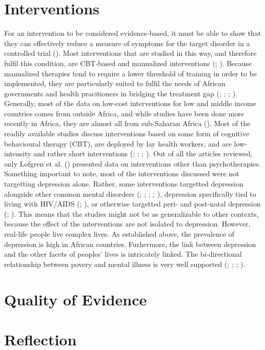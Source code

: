 \documentclass[stu,a4paper,12pt,donotrepeattitle]{apa7}
\begin{document}
\section{Interventions}
For an intervention to be considered evidence-based, it must be able to show
that they can effectively reduce a measure of symptoms for the target disorder
in a controlled trial (\cite{cook17}). Most interventions that are studied in
this way, and therefore fulfil this condition, are CBT-based and manualized
interventions (\cite{cook17}; \cite{shed18}). Because manualized therapies
tend to require a lower threshold of training in order to be implemented, they
are particularly suited to fulfil the needs of African governments and health
pracitioners in bridging the treatment gap (\cite{cook17}; \cite{douketal21};
\cite{lunetal14}; \cite{Osetal20}).\\
Generally, most of the data on low-cost interventions for low and middle income
countries comes from outside Africa, and while studies have been done more
recently in Africa, they are almost all from sub-Saharan Africa
(\cite{logetal18}). Most of the readily available studies discuss interventions
based on some form of cognitive behavioural therapy (CBT), are deployed by
lay health workers, and are low-intensity and rather short interventions
(\cite{chibandaetal11}; \cite{fernaetal21}; \cite{logetal18}; \cite{lunetal14}).
Out of all the articles reviewed, only Lofgren et al. (\citeyear{logetal18})
presented data on interventions other than psychotherapies.\\
Something important to note, most of the interventions discussed were not
targetting depression alone. Rather, some interventions targetted depression
alongside other common mental disorders (\cite{abasetal16}; \cite{chibandaetal11};
\cite{chibandaetal15}; \cite{chibandaetal16}; \cite{douketal21}), depression
specifically tied to living with HIV/AIDS (\cite{logetal18};
\cite{petersenetal14}), or otherwise targetted peri- and post-natal depression
(\cite{lunetal14}; \cite{nyatetal16}). This means that the studies might not be
as generalizable to other contexts, because the effect of the interventions are
not isolated to depression. However, real-life people live complex lives. As
established above, the prevalence of depression is high in African countries.
Furhermore, the link between depression and the other facets of peoples' lives
is intricately linked. The bi-directional relationship between povery and
mental illness is very well supported (\cite{lundetal10}; \cite{lund12};
\cite{ridetal20}; \cite{wahl17}).
\section{Quality of Evidence}
\section{Reflection}
\newpage
\printbibliography
\end{document}

